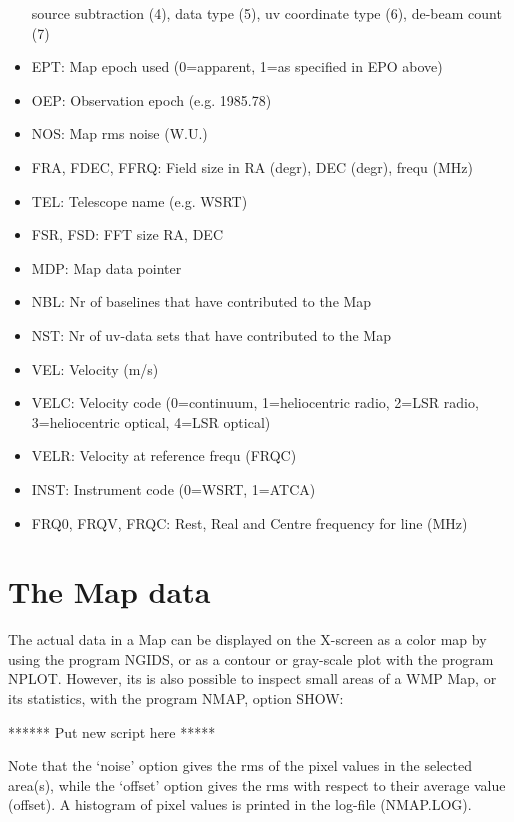 \begin{itemize}
	source subtraction (4), data type (5), 
	uv coordinate type (6), de-beam count (7) 
\item  EPT: Map epoch used (0=apparent, 1=as specified in EPO above) 
\item  OEP: Observation epoch (e.g. 1985.78) 
\item  NOS: Map rms noise (W.U.) 
\item  FRA, FDEC, FFRQ: Field size in RA (degr), DEC (degr), frequ (MHz) 
\item  TEL: Telescope name (e.g. WSRT) 
\item  FSR, FSD: FFT size RA, DEC 
\item  MDP: Map data pointer 
\item  NBL: Nr of baselines that have contributed to the Map 
\item  NST: Nr of uv-data sets that have contributed to the Map 
\item  VEL: Velocity (m/s) 
\item  VELC: Velocity code (0=continuum, 1=heliocentric radio, 2=LSR radio, 
	3=heliocentric optical, 4=LSR optical) 
\item  VELR: Velocity at reference frequ (FRQC) 
\item  INST: Instrument code (0=WSRT, 1=ATCA) 
\item  FRQ0, FRQV, FRQC: Rest, Real and Centre frequency for line (MHz) 
%
\end{itemize} 



\section{The Map data} 
\label{.data} 

	The actual data in a Map can be displayed on the X-screen as a color
map by using the program NGIDS, or as a contour or gray-scale plot with the
program NPLOT.  However, its is also possible to inspect small areas of a WMP
Map, or its statistics, with the program NMAP, option 
SHOW:


****** Put new script here ***** 


Note that the `noise' option gives the rms of the pixel values in the selected
area(s), while the `offset' option gives the rms with respect to their average
value (offset). A histogram of pixel values is printed in the log-file
(NMAP.LOG). 

